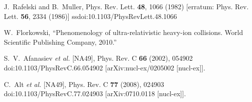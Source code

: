 
\begin{thebibliography}{99}






J.~Rafelski and B.~Muller,
Phys. Rev. Lett. \textbf{48}, 1066 (1982)
[erratum: Phys. Rev. Lett. \textbf{56}, 2334 (1986)]
ssdoi:10.1103/PhysRevLett.48.1066

W.~Florkowski,
``Phenomenology of ultra-relativistic heavy-ion collisions. World Scientific Publishing Company, 2010.''


S.~V.~Afanasiev \textit{et al.} [NA49],
Phys. Rev. C \textbf{66} (2002), 054902
doi:10.1103/PhysRevC.66.054902
[arXiv:nucl-ex/0205002 [nucl-ex]].

C.~Alt \textit{et al.} [NA49],
Phys. Rev. C \textbf{77} (2008), 024903
doi:10.1103/PhysRevC.77.024903
[arXiv:0710.0118 [nucl-ex]].


\end{thebibliography}

